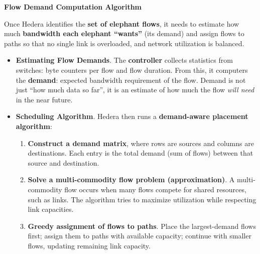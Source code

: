 \highspace
\begin{flushleft}
    \textcolor{Green3}{ \textbf{Flow Demand Computation Algorithm}}
\end{flushleft}
Once Hedera identifies the \textbf{set of elephant flows}, it needs to estimate how much \textbf{bandwidth each elephant ``wants''} (its demand) and assign flows to paths so that no single link is overloaded, and network utilization is balanced.
\begin{itemize}
    \item[\textcolor{Green3}{\faIcon{chart-bar}}] \textcolor{Green3}{\textbf{Estimating Flow Demands}}. The \textbf{controller} collects statistics from switches: byte counters per flow and flow duration. From this, it computers the \textbf{demand}: expected bandwidth requirement of the flow. Demand is not just ``how much data so far'', it is an estimate of how much the flow \emph{will need} in the near future.

    \item[\textcolor{Green3}{\faIcon{tools}}] \textcolor{Green3}{\textbf{Scheduling Algorithm}}. Hedera then runs a \textbf{demand-aware placement algorithm}:
    \begin{enumerate}
        \item \textbf{Construct a demand matrix}, where rows are sources and columns are destinations. Each entry is the total demand (sum of flows) between that source and destination.
        \item \textbf{Solve a multi-commodity flow problem (approximation)}. A multi-commodity flow occurs when many flows compete for shared resources, such as links. The algorithm tries to maximize utilization while respecting link capacities.
        \item \textbf{Greedy assignment of flows to paths}. Place the largest-demand flows first; assign them to paths with available capacity; continue with smaller flows, updating remaining link capacity.
    \end{enumerate}
\end{itemize}

